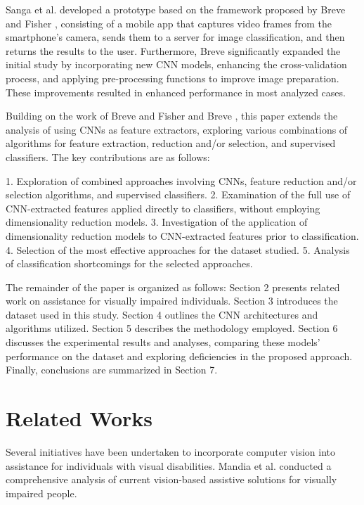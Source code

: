 \documentclass[preprint,12pt]{elsarticle}
\begin{document}
Sanga et al. \cite{sanga2023} developed a prototype based on the framework proposed by Breve and Fisher \cite{breve2020}, consisting of a mobile app that captures video frames from the smartphone's camera, sends them to a server for image classification, and then returns the results to the user. Furthermore, Breve \cite{breve2023} significantly expanded the initial study by incorporating new CNN models, enhancing the cross-validation process, and applying pre-processing functions to improve image preparation. These improvements resulted in enhanced performance in most analyzed cases.

Building on the work of Breve and Fisher \cite{breve2020} and Breve \cite{breve2023}, this paper extends the analysis of using CNNs as feature extractors, exploring various combinations of algorithms for feature extraction, reduction and/or selection, and supervised classifiers. The key contributions are as follows:

1. Exploration of combined approaches involving CNNs, feature reduction and/or selection algorithms, and supervised classifiers.
2. Examination of the full use of CNN-extracted features applied directly to classifiers, without employing dimensionality reduction models.
3. Investigation of the application of dimensionality reduction models to CNN-extracted features prior to classification.
4. Selection of the most effective approaches for the dataset studied.
5. Analysis of classification shortcomings for the selected approaches.

The remainder of the paper is organized as follows: Section 2 presents related work on assistance for visually impaired individuals. Section 3 introduces the dataset used in this study. Section 4 outlines the CNN architectures and algorithms utilized. Section 5 describes the methodology employed. Section 6 discusses the experimental results and analyses, comparing these models' performance on the dataset and exploring deficiencies in the proposed approach. Finally, conclusions are summarized in Section 7. 

\section{Related Works}\label{sec:works}

Several initiatives have been undertaken to incorporate computer vision into assistance for individuals with visual disabilities. Mandia et al. \cite{mandia2023} conducted a comprehensive analysis of current vision-based assistive solutions for visually impaired people.
\end{document}
